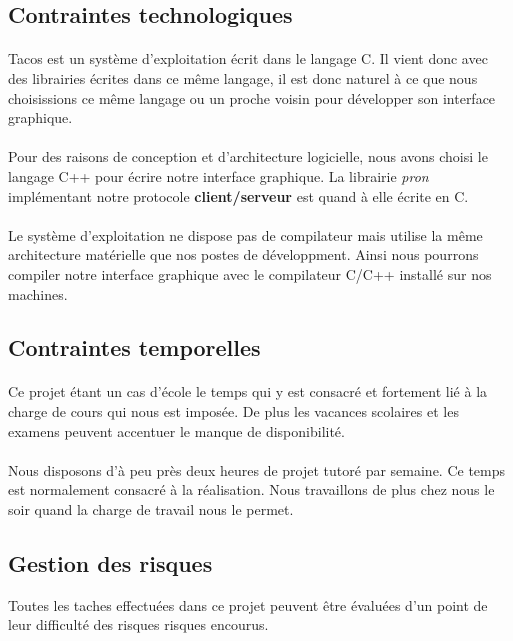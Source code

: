 
\subsection{Contraintes technologiques}
\paragraph{}
Tacos est un système d'exploitation écrit dans le langage C. Il vient donc avec des librairies écrites dans ce même langage, il est donc naturel à ce que nous choisissions ce même langage ou un proche voisin pour développer son interface graphique.
\paragraph{}
Pour des raisons de conception et d'architecture logicielle, nous avons choisi le langage C++ pour écrire notre interface graphique. La librairie \textit{pron} implémentant notre protocole \textbf{client/serveur} est quand à elle écrite en C. 
\paragraph{}
Le système d'exploitation ne dispose pas de compilateur mais utilise la même architecture matérielle que nos postes de développment. Ainsi nous pourrons compiler notre interface graphique avec le compilateur C/C++ installé sur nos machines.
\subsection{Contraintes temporelles}
\paragraph{}
Ce projet étant un cas d'école le temps qui y est consacré et fortement lié à la charge de cours qui nous est imposée. 
De plus les vacances scolaires et les examens peuvent accentuer le manque de disponibilité.
\paragraph{}
Nous disposons d'à peu près deux heures de projet tutoré par semaine. Ce temps est normalement consacré à la réalisation. Nous travaillons de plus chez nous le soir quand la charge de travail nous le permet.
\subsection{Gestion des risques}
Toutes les taches effectuées dans ce projet peuvent être évaluées d'un point de leur difficulté des risques risques encourus.
